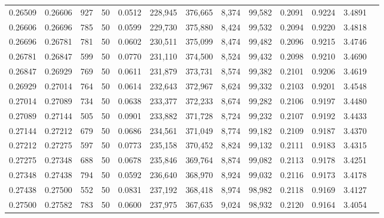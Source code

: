 \begin{tabular}{rrrrrrrrrrrrr}
0.26509 & 0.26606 &   927 &  50 &                                     0.0512 & 228,945 & 376,665 &   8,374 &  99,582 & 0.2091 & 0.9224 & 3.4891 \\
0.26606 & 0.26696 &   785 &  50 &                                     0.0599 & 229,730 & 375,880 &   8,424 &  99,532 & 0.2094 & 0.9220 & 3.4818 \\
0.26696 & 0.26781 &   781 &  50 &                                     0.0602 & 230,511 & 375,099 &   8,474 &  99,482 & 0.2096 & 0.9215 & 3.4746 \\
0.26781 & 0.26847 &   599 &  50 &                                     0.0770 & 231,110 & 374,500 &   8,524 &  99,432 & 0.2098 & 0.9210 & 3.4690 \\
0.26847 & 0.26929 &   769 &  50 &                                     0.0611 & 231,879 & 373,731 &   8,574 &  99,382 & 0.2101 & 0.9206 & 3.4619 \\
0.26929 & 0.27014 &   764 &  50 &                                     0.0614 & 232,643 & 372,967 &   8,624 &  99,332 & 0.2103 & 0.9201 & 3.4548 \\
0.27014 & 0.27089 &   734 &  50 &                                     0.0638 & 233,377 & 372,233 &   8,674 &  99,282 & 0.2106 & 0.9197 & 3.4480 \\
0.27089 & 0.27144 &   505 &  50 &                                     0.0901 & 233,882 & 371,728 &   8,724 &  99,232 & 0.2107 & 0.9192 & 3.4433 \\
0.27144 & 0.27212 &   679 &  50 &                                     0.0686 & 234,561 & 371,049 &   8,774 &  99,182 & 0.2109 & 0.9187 & 3.4370 \\
0.27212 & 0.27275 &   597 &  50 &                                     0.0773 & 235,158 & 370,452 &   8,824 &  99,132 & 0.2111 & 0.9183 & 3.4315 \\
0.27275 & 0.27348 &   688 &  50 &                                     0.0678 & 235,846 & 369,764 &   8,874 &  99,082 & 0.2113 & 0.9178 & 3.4251 \\
0.27348 & 0.27438 &   794 &  50 &                                     0.0592 & 236,640 & 368,970 &   8,924 &  99,032 & 0.2116 & 0.9173 & 3.4178 \\
0.27438 & 0.27500 &   552 &  50 &                                     0.0831 & 237,192 & 368,418 &   8,974 &  98,982 & 0.2118 & 0.9169 & 3.4127 \\
0.27500 & 0.27582 &   783 &  50 &                                     0.0600 & 237,975 & 367,635 &   9,024 &  98,932 & 0.2120 & 0.9164 & 3.4054 \\

\end{tabular}
